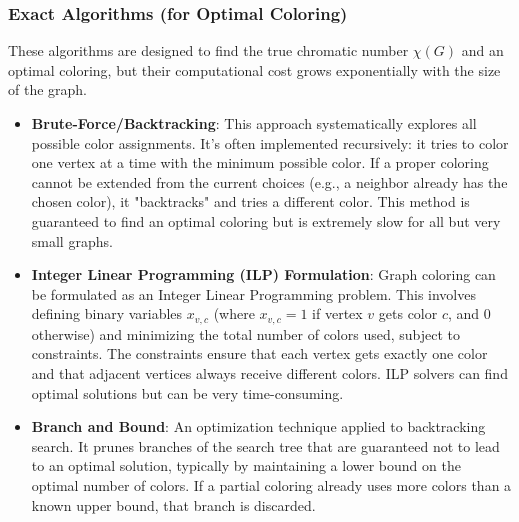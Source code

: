 \documentclass[11pt, a4paper]{article}
\begin{document}
\subsubsection{Exact Algorithms (for Optimal Coloring)}
These algorithms are designed to find the true chromatic number $\chi(G)$ and an optimal coloring, but their computational cost grows exponentially with the size of the graph.
\begin{itemize}[noitemsep,topsep=3pt,parsep=3pt,partopsep=0pt]
    \item \textbf{Brute-Force/Backtracking}: This approach systematically explores all possible color assignments. It's often implemented recursively: it tries to color one vertex at a time with the minimum possible color. If a proper coloring cannot be extended from the current choices (e.g., a neighbor already has the chosen color), it "backtracks" and tries a different color. This method is guaranteed to find an optimal coloring but is extremely slow for all but very small graphs.
    \item \textbf{Integer Linear Programming (ILP) Formulation}: Graph coloring can be formulated as an Integer Linear Programming problem. This involves defining binary variables $x_{v,c}$ (where $x_{v,c}=1$ if vertex $v$ gets color $c$, and $0$ otherwise) and minimizing the total number of colors used, subject to constraints. The constraints ensure that each vertex gets exactly one color and that adjacent vertices always receive different colors. ILP solvers can find optimal solutions but can be very time-consuming.
    \item \textbf{Branch and Bound}: An optimization technique applied to backtracking search. It prunes branches of the search tree that are guaranteed not to lead to an optimal solution, typically by maintaining a lower bound on the optimal number of colors. If a partial coloring already uses more colors than a known upper bound, that branch is discarded.
\end{itemize}
\end{document}
